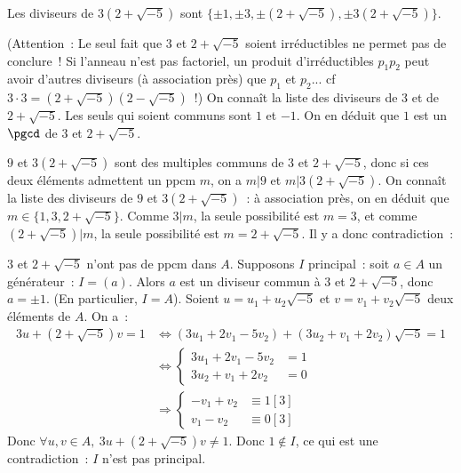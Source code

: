 {\begin{enumerate}
{Les diviseurs de $3(2+\sqrt{-5})$ sont
$\{\pm1,\pm3,\pm(2+\sqrt{-5}),\pm3(2+\sqrt{-5})\}$.

(Attention~: Le seul fait que $3$ et $2+\sqrt{-5}$ soient irréductibles
ne permet pas de conclure~! Si l'anneau n'est pas factoriel, un produit
d'irréductibles $p_{1}p_{2}$ peut avoir d'autres diviseurs (à association
près) que $p_{1}$ et $p_{2}$... cf $3\cdot3=(2+\sqrt{-5})(2-\sqrt{-5})$~!)
On connaît la liste des diviseurs de $3$ et de $2+\sqrt{-5}$. Les seuls
qui soient communs sont $1$ et $-1$. On en déduit que $1$ est un $\pgcd$
de $3$ et $2+\sqrt{-5}$. 

\medskip

$9$ et $3(2+\sqrt{-5})$ sont des multiples communs de $3$ et
$2+\sqrt{-5}$, donc si ces deux éléments admettent un $\mathrm{ppcm}$ $m$, on a
$m|9$ et $m|3(2+\sqrt{-5})$. On connaît la liste des diviseurs de $9$ et
$3(2+\sqrt{-5})$~: à association près, on en déduit que
$m\in\{1,3,2+\sqrt{-5}\}$. Comme $3|m$, la seule possibilité est $m=3$,
et comme $(2+\sqrt{-5})|m$, la seule possibilité est $m=2+\sqrt{-5}$. Il
y a donc contradiction~:

$3$ et $2+\sqrt{-5}$ n'ont pas de $\mathrm{ppcm}$ dans $A$.
Supposons $I$ principal~: soit $a\in A$ un générateur~: $I=(a)$. Alors
$a$ est un diviseur commun à $3$ et $2+\sqrt{-5}$, donc $a=\pm1$. (En
particulier, $I=A$). Soient $u=u_{1}+u_{2}\sqrt{-5}$ et
$v=v_{1}+v_{2}\sqrt{-5}$ deux éléments de $A$. On a~:
\begin{align*}
3u+(2+\sqrt{-5})v=1
&\Leftrightarrow (3u_{1}+2v_{1}-5v_{2})+(3u_{2}+v_{1}+2v_{2})\sqrt{-5}=1\\
&\Leftrightarrow \left\{
\begin{array}{rl}
3u_{1}+2v_{1}-5v_{2}&=1\\
3u_{2}+v_{1}+2v_{2}&=0
\end{array}\right.\\
&\Rightarrow \left\{
\begin{array}{rl}
-v_{1}+v_{2}&\equiv1 [3]\\
v_{1}-v_{2}&\equiv0 [3]
\end{array}\right.
\end{align*}
Donc $\forall u,v\in A,\ 3u+(2+\sqrt{-5})v\neq 1$. Donc $1\notin I$, ce
qui est une contradiction~: $I$ n'est pas principal.

}
\end{enumerate}}
